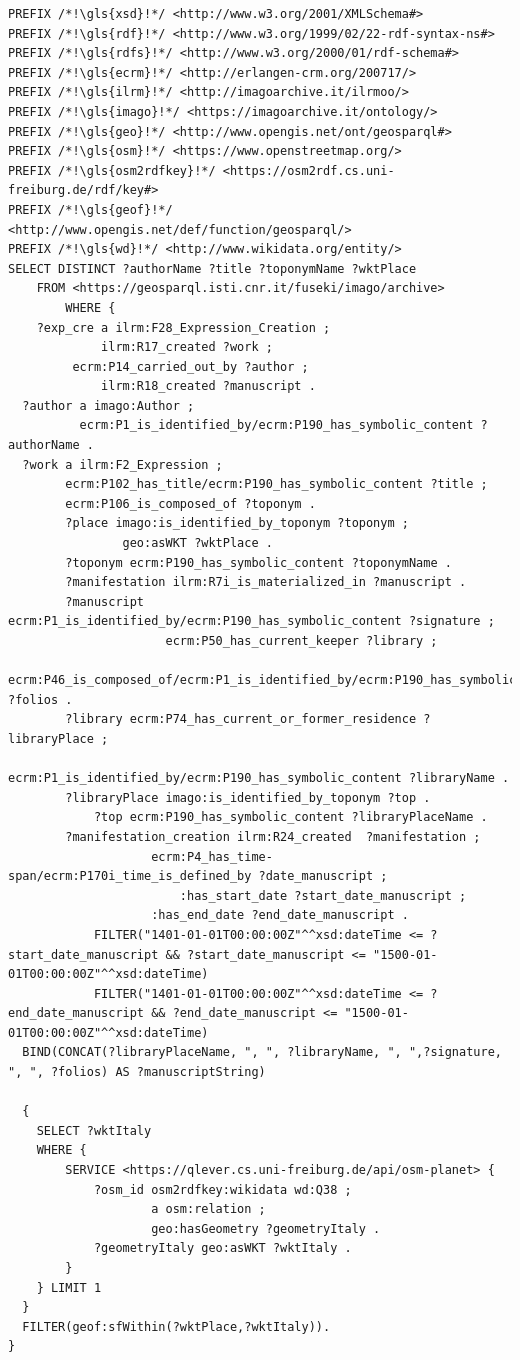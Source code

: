 \begin{lstlisting}[caption=GeoSPARQL Query 7, label={lst:query7}]
PREFIX /*!\gls{xsd}!*/ <http://www.w3.org/2001/XMLSchema#>
PREFIX /*!\gls{rdf}!*/ <http://www.w3.org/1999/02/22-rdf-syntax-ns#>
PREFIX /*!\gls{rdfs}!*/ <http://www.w3.org/2000/01/rdf-schema#>
PREFIX /*!\gls{ecrm}!*/ <http://erlangen-crm.org/200717/>
PREFIX /*!\gls{ilrm}!*/ <http://imagoarchive.it/ilrmoo/>
PREFIX /*!\gls{imago}!*/ <https://imagoarchive.it/ontology/>
PREFIX /*!\gls{geo}!*/ <http://www.opengis.net/ont/geosparql#>
PREFIX /*!\gls{osm}!*/ <https://www.openstreetmap.org/>
PREFIX /*!\gls{osm2rdfkey}!*/ <https://osm2rdf.cs.uni-freiburg.de/rdf/key#>
PREFIX /*!\gls{geof}!*/ <http://www.opengis.net/def/function/geosparql/> 
PREFIX /*!\gls{wd}!*/ <http://www.wikidata.org/entity/>
SELECT DISTINCT ?authorName ?title ?toponymName ?wktPlace 
	FROM <https://geosparql.isti.cnr.it/fuseki/imago/archive>
		WHERE {
    ?exp_cre a ilrm:F28_Expression_Creation ;
  		     ilrm:R17_created ?work ;
         ecrm:P14_carried_out_by ?author ;
      		 ilrm:R18_created ?manuscript .
  ?author a imago:Author ;
          ecrm:P1_is_identified_by/ecrm:P190_has_symbolic_content ?authorName .
  ?work a ilrm:F2_Expression ;
        ecrm:P102_has_title/ecrm:P190_has_symbolic_content ?title ;
        ecrm:P106_is_composed_of ?toponym . 
  		?place imago:is_identified_by_toponym ?toponym ;
         		geo:asWKT ?wktPlace .
  		?toponym ecrm:P190_has_symbolic_content ?toponymName .
		?manifestation ilrm:R7i_is_materialized_in ?manuscript .
   		?manuscript ecrm:P1_is_identified_by/ecrm:P190_has_symbolic_content ?signature ;
		              ecrm:P50_has_current_keeper ?library ;
		              ecrm:P46_is_composed_of/ecrm:P1_is_identified_by/ecrm:P190_has_symbolic_content ?folios .
  		?library ecrm:P74_has_current_or_former_residence ?libraryPlace ;
		  			ecrm:P1_is_identified_by/ecrm:P190_has_symbolic_content ?libraryName .
  		?libraryPlace imago:is_identified_by_toponym ?top .
            ?top ecrm:P190_has_symbolic_content ?libraryPlaceName .
	  	?manifestation_creation ilrm:R24_created  ?manifestation ;
	 		        ecrm:P4_has_time-span/ecrm:P170i_time_is_defined_by ?date_manuscript ;
	    				:has_start_date ?start_date_manuscript ;
	 				:has_end_date ?end_date_manuscript .
		    FILTER("1401-01-01T00:00:00Z"^^xsd:dateTime <= ?start_date_manuscript && ?start_date_manuscript <= "1500-01-01T00:00:00Z"^^xsd:dateTime)
            FILTER("1401-01-01T00:00:00Z"^^xsd:dateTime <= ?end_date_manuscript && ?end_date_manuscript <= "1500-01-01T00:00:00Z"^^xsd:dateTime)
  BIND(CONCAT(?libraryPlaceName, ", ", ?libraryName, ", ",?signature, ", ", ?folios) AS ?manuscriptString)
  
  { 
    SELECT ?wktItaly 
    WHERE {
        SERVICE <https://qlever.cs.uni-freiburg.de/api/osm-planet> { 
            ?osm_id osm2rdfkey:wikidata wd:Q38 ;
                    a osm:relation ;
                    geo:hasGeometry ?geometryItaly .
            ?geometryItaly geo:asWKT ?wktItaly .     
        } 
    } LIMIT 1
  }
  FILTER(geof:sfWithin(?wktPlace,?wktItaly)). 
} 
\end{lstlisting}

